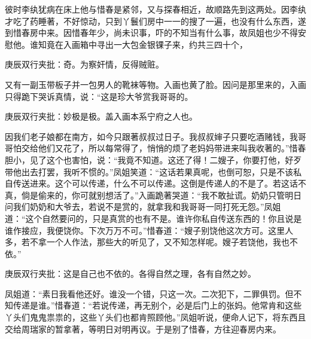 \begin{parag}
\end{parag}


\begin{parag}
    彼时李纨犹病在床上他与惜春是紧邻，又与探春相近，故顺路先到这两处。因李纨才吃了药睡著，不好惊动，只到丫鬟们房中一一的搜了一遍，也没有什么东西，遂到惜春房中来。因惜春年少，尚未识事，吓的不知当有什么事，故凤姐也少不得安慰他。谁知竟在入画箱中寻出一大包金银锞子来，约共三四十个，\begin{note}庚辰双行夹批：奇。为察奸情，反得贼赃。\end{note}又有一副玉带板子并一包男人的靴袜等物。入画也黄了脸。因问是那里来的，入画只得跪下哭诉真情，说：“这是珍大爷赏我哥哥的。\begin{note}庚辰双行夹批：妙极是极。盖入画本系宁府之人也。\end{note}因我们老子娘都在南方，如今只跟著叔叔过日子。我叔叔婶子只要吃酒赌钱，我哥哥怕交给他们又花了，所以每常得了，悄悄的烦了老妈妈带进来叫我收著的。”惜春胆小，见了这个也害怕，说：“我竟不知道。这还了得！二嫂子，你要打他，好歹带他出去打罢，我听不惯的。”凤姐笑道：“这话若果真呢，也倒可恕，只是不该私自传送进来。这个可以传递，什么不可以传递。这倒是传递人的不是了。若这话不真，倘是偷来的，你可就别想活了。”入画跪著哭道：“我不敢扯谎。奶奶只管明日问我们奶奶和大爷去，若说不是赏的，就拿我和我哥哥一同打死无怨。”凤姐道：“这个自然要问的，只是真赏的也有不是。谁许你私自传送东西的！你且说是谁作接应，我便饶你。下次万万不可。”惜春道：“嫂子别饶他这次方可。这里人多，若不拿一个人作法，那些大的听见了，又不知怎样呢。嫂子若饶他，我也不依。”\begin{note}庚辰双行夹批：这是自己也不依的。各得自然之理，各有自然之妙。\end{note}凤姐道：“素日我看他还好。谁没一个错，只这一次。二次犯下，二罪俱罚。但不知传递是谁。”惜春道：“若说传递，再无别个，必是后门上的张妈。他常肯和这些丫头们鬼鬼祟祟的，这些丫头们也都肯照顾他。”凤姐听说，便命人记下，将东西且交给周瑞家的暂拿著，等明日对明再议。于是别了惜春，方往迎春房内来。
\end{parag}


